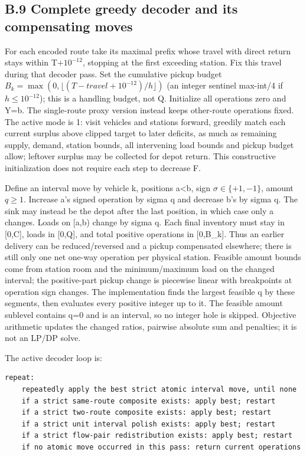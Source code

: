 \documentclass[
  american,
  11pt,
]{article}
\newcounter{none} %
\begin{document}
\subsection{B.9 Complete greedy decoder and its compensating
moves}\label{b.9-complete-greedy-decoder-and-its-compensating-moves}

For each encoded route take its maximal prefix whose travel with direct
return stays within T+\(10^{-12}\), stopping at the first exceeding
station. Fix this travel during that decoder pass. Set the cumulative
pickup budget \(B_k=\max(0,\lfloor(T-travel+10^{-12})/h\rfloor)\) (an
integer sentinel max-int/4 if \(h\le10^{-12}\)); this is a handling
budget, not Q. Initialize all operations zero and Y=b. The single-route
proxy version instead keeps other-route operations fixed. The active
mode is 1: visit vehicles and stations forward, greedily match each
current surplus above clipped target to later deficits, as much as
remaining supply, demand, station bounds, all intervening load bounds
and pickup budget allow; leftover surplus may be collected for depot
return. This constructive initialization does not require each step to
decrease F.

Define an interval move by vehicle k, positions a\textless b, sign
\(\sigma\in\{+1,-1\}\), amount \(q\ge1\). Increase a's signed operation
by sigma q and decrease b's by sigma q. The sink may instead be the
depot after the last position, in which case only a changes. Loads on
{[}a,b) change by sigma q. Each final inventory must stay in {[}0,C{]},
loads in {[}0,Q{]}, and total positive operations in {[}0,B\_\allowbreak{}k{]}. Thus
an earlier delivery can be reduced/reversed and a pickup compensated
elsewhere; there is still only one net one-way operation per physical
station. Feasible amount bounds come from station room and the
minimum/maximum load on the changed interval; the positive-part pickup
change is piecewise linear with breakpoints at operation sign changes.
The implementation finds the largest feasible q by these segments, then
evaluates every positive integer up to it. The feasible amount sublevel
contains q=0 and is an interval, so no integer hole is skipped.
Objective arithmetic updates the changed ratios, pairwise absolute sum
and penalties; it is not an LP/DP solve.

The active decoder loop is:

\begin{lstlisting}
repeat:
    repeatedly apply the best strict atomic interval move, until none
    if a strict same-route composite exists: apply best; restart
    if a strict two-route composite exists: apply best; restart
    if a strict unit interval polish exists: apply best; restart
    if a strict flow-pair redistribution exists: apply best; restart
    if no atomic move occurred in this pass: return current operations
\end{lstlisting}
\end{document}
